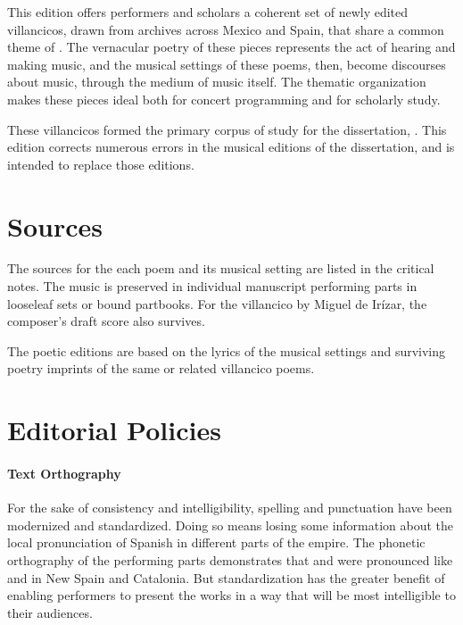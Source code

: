 This edition offers performers and scholars a coherent set of newly edited villancicos, drawn from archives across Mexico and Spain, that share a common theme of .
The vernacular poetry of these pieces represents the act of hearing and making music, and the musical settings of these poems, then, become discourses about music, through the medium of music itself.
The thematic organization makes these pieces ideal both for concert programming and for scholarly study.%
  \begin{Footnote}
  These villancicos formed the primary corpus of study for the dissertation, \autocite{Cashner:PhD}.
  This edition corrects numerous errors in the musical editions of the dissertation, and is intended to replace those editions.
  \end{Footnote}

\section{Sources}

The sources for the each poem and its musical setting are listed in the critical notes.
The music is preserved in individual manuscript performing parts in looseleaf sets or bound partbooks.
For the villancico by Miguel de Irízar, the composer's draft score also survives.

The poetic editions are based on the lyrics of the musical settings and surviving poetry imprints of the same or related villancico poems.

\section{Editorial Policies}

\paragraph{Text Orthography}
For the sake of consistency and intelligibility, spelling and punctuation have been modernized and standardized.
Doing so means losing some information about the local pronunciation of Spanish in different parts of the empire.
The phonetic orthography of the performing parts demonstrates that  and  were pronounced like  and  in New Spain and Catalonia.
But standardization has the greater benefit of enabling performers to present the works in a way that will be most intelligible to their audiences.

